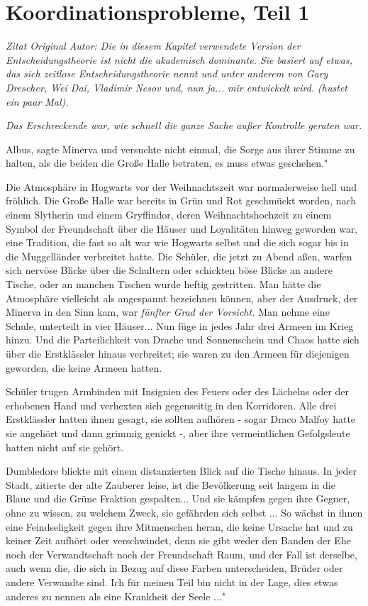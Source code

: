 \chapter{Koordinationsprobleme, Teil 1}

\emph{Zitat Original Autor: Die in diesem Kapitel verwendete Version der
Entscheidungstheorie ist nicht die akademisch dominante. Sie basiert auf etwas,
das sich \glqq zeitlose Entscheidungstheorie\grqq{} nennt und unter anderem von
Gary Drescher, Wei Dai, Vladimir Nesov und, nun ja... mir entwickelt wird.
(hustet ein paar Mal).}


\emph{Das Erschreckende war, wie schnell die ganze Sache außer Kontrolle geraten war.}

\glqq Albus\grqq{}, sagte Minerva und versuchte nicht einmal, die Sorge aus
ihrer Stimme zu halten, als die beiden die Große Halle betraten, \glqq es muss
etwas geschehen."

Die Atmosphäre in Hogwarts vor der Weihnachtszeit war normalerweise hell und
fröhlich. Die Große Halle war bereits in Grün und Rot geschmückt worden, nach
einem Slytherin und einem Gryffindor, deren Weihnachtshochzeit zu einem Symbol
der Freundschaft über die Häuser und Loyalitäten hinweg geworden war, eine
Tradition, die fast so alt war wie Hogwarts selbst und die sich sogar bis in die
Muggelländer verbreitet hatte. Die Schüler, die jetzt zu Abend aßen, warfen sich
nervöse Blicke über die Schultern oder schickten böse Blicke an andere Tische,
oder an manchen Tischen wurde heftig gestritten. Man hätte die Atmosphäre
vielleicht als angespannt bezeichnen können, aber der Ausdruck, der Minerva in
den Sinn kam, war \emph{fünfter Grad der Vorsicht.} Man nehme eine Schule,
unterteilt in vier Häuser... Nun füge in jedes Jahr drei Armeen im Krieg hinzu.
Und die Parteilichkeit von Drache und Sonnenschein und Chaos hatte sich über die
Erstklässler hinaus verbreitet; sie waren zu den Armeen für diejenigen geworden,
die keine Armeen hatten.

Schüler trugen Armbinden mit Insignien des Feuers oder des Lächelns oder der
erhobenen Hand und verhexten sich gegenseitig in den Korridoren. Alle drei
Erstklässler hatten ihnen gesagt, sie sollten aufhören - sogar Draco Malfoy
hatte sie angehört und dann grimmig genickt -, aber ihre vermeintlichen
Gefolgsleute hatten nicht auf sie gehört.

Dumbledore blickte mit einem distanzierten Blick auf die Tische hinaus. \glqq In
jeder Stadt\grqq{}, zitierte der alte Zauberer leise, \glqq ist die Bevölkerung
seit langem in die Blaue und die Grüne Fraktion gespalten... Und sie kämpfen
gegen ihre Gegner, ohne zu wissen, zu welchem Zweck, sie gefährden sich selbst
... So wächst in ihnen eine Feindseligkeit gegen ihre Mitmenschen heran, die
keine Ursache hat und zu keiner Zeit aufhört oder verschwindet, denn sie gibt
weder den Banden der Ehe noch der Verwandtschaft noch der Freundschaft Raum, und
der Fall ist derselbe, auch wenn die, die sich in Bezug auf diese Farben
unterscheiden, Brüder oder andere Verwandte sind. Ich für meinen Teil bin nicht
in der Lage, dies etwas anderes zu nennen als eine Krankheit der Seele ..."

